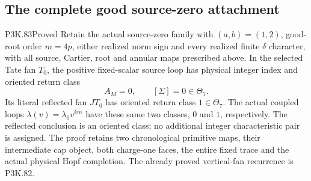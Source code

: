 \subsection{The complete good source-zero attachment}
\begin{statement}{P3K.83}{Proved}
Retain the actual source-zero family with
\((a,b)=(1,2)\), good-root order \(m=4p\), either realized norm
sign and every realized finite \(\delta\) character, with all source,
Cartier, root and annular maps prescribed above. In the selected
Tate fan \(T_0\), the positive fixed-scalar source loop has physical
integer index and oriented return class
\[
                         A_M=0,\qquad [\Sigma]=0\in\Theta_7.
\]
Its literal reflected fan \(JT_0\) has oriented return class
\(1\in\Theta_7\). The actual coupled loops
\(\lambda(v)=\lambda_0v^{km}\) have these same two classes,
\(0\) and \(1\), respectively. The reflected conclusion is an
oriented class; no additional integer characteristic pair is
assigned. The proof retains two chronological primitive maps,
their intermediate cap object, both charge-one faces, the entire
fixed trace and the actual physical Hopf completion. The already
proved vertical-fan recurrence is P3K.82.
\end{statement}

